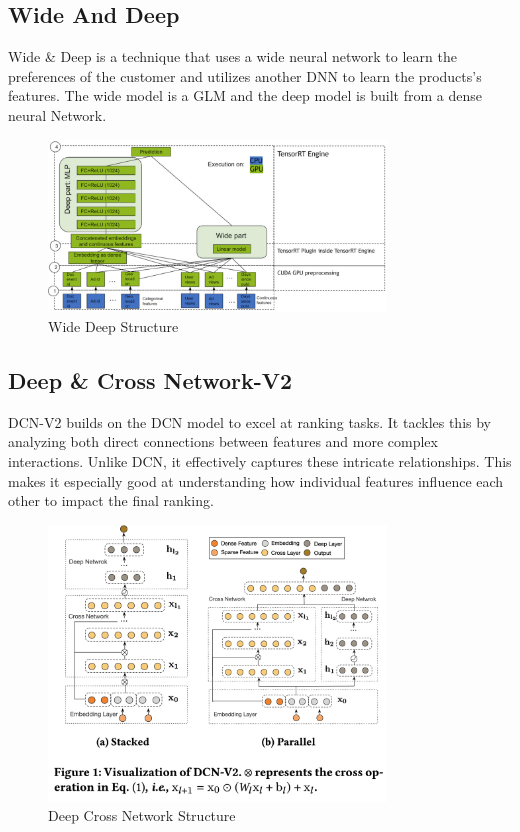 \subsection{Wide And Deep}
Wide \& Deep is a technique that uses a wide neural network to learn the preferences of the customer and utilizes another DNN to learn the products's features. The wide model is a GLM and the deep model is built from a dense neural Network.
\begin{figure}[H]
    \centering
    \includegraphics[width=0.8\textwidth]{assets/wide_deep.png}
    \caption[Wide Deep Structure]{Wide Deep Structure \cite{NvidiaRecSys}}
    \label{fig:wide-deep}
\end{figure}
\subsection{Deep \& Cross Network-V2}
DCN-V2 builds on the DCN model to excel at ranking tasks. It tackles this by analyzing both direct connections between features and more complex interactions. Unlike DCN, it effectively captures these intricate relationships. This makes it especially good at understanding how individual features influence each other to impact the final ranking.\cite{DCNv2}
\begin{figure}[H]
    \centering
    \includegraphics[width=0.8\textwidth]{assets/dcn-v2.png}
    \caption[Deep Cross Network Structure]{Deep Cross Network Structure \cite{DCNv2}}
    \label{fig:deep-cross-network}
\end{figure}

